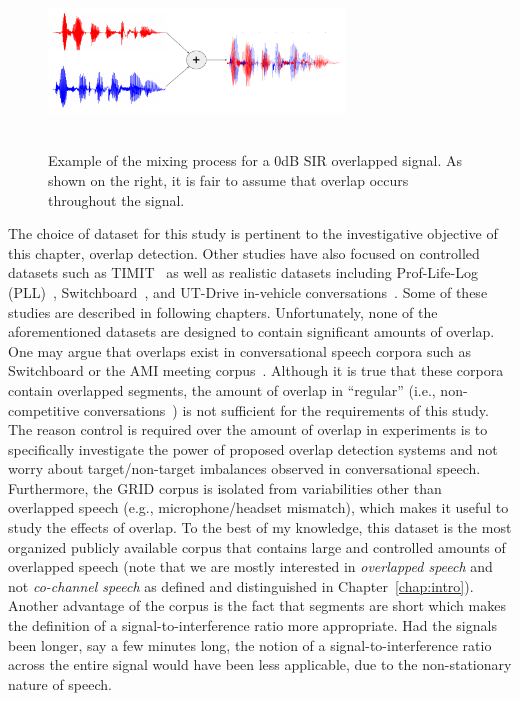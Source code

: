 \vspace{0mm}
\begin{figure}[h!]
	\centering
	\includegraphics[height =1.8in, width=0.7\textwidth]{figures/GRID_example_overlap-crop}
	\vspace{-2mm}
	\caption{ 
		Example of the mixing process for a 0dB SIR overlapped signal. As shown on the right, it is fair to assume that overlap occurs throughout the signal.}
	\label{fig:ch2_overlap_example}
\end{figure}

The choice of dataset for this study is pertinent to the investigative objective of this chapter, overlap detection. 
Other studies have also focused on controlled datasets such as TIMIT~\cite{nav_icassp13} as well as realistic datasets including Prof-Life-Log (PLL)~\cite{ziaei2013prof,nav_icassp15}, Switchboard~\cite{shokouhi2015}, and UT-Drive in-vehicle conversations~\cite{sathyanarayana2013belt}. 
Some of these studies are described in following chapters. 
Unfortunately, none of the aforementioned datasets are designed to contain significant amounts of overlap. 
One may argue that overlaps exist in conversational speech corpora such as Switchboard or the AMI meeting corpus~\cite{amicorpus}. 
Although it is true that these corpora contain overlapped segments, the amount of overlap in ``regular'' (i.e., non-competitive conversations~\cite{schegloff2000overlapping}) is not sufficient for the requirements of this study. 
The reason control is required over the amount of overlap in experiments is to specifically investigate the power of proposed overlap detection systems and not worry about target/non-target imbalances observed in conversational speech. 
Furthermore, the GRID corpus is isolated from variabilities other than overlapped speech (e.g., microphone/headset mismatch), which makes it useful to study the effects of overlap. 
To the best of my knowledge, this dataset is the most organized publicly available corpus that contains large and controlled amounts of overlapped speech (note that we are mostly interested in {\it overlapped speech} and not {\it co-channel speech} as defined and distinguished in Chapter~\ref{chap:intro}). 
Another advantage of the corpus is the fact that segments are short which makes the definition of a signal-to-interference ratio more appropriate. Had the signals been longer, say a few minutes long, the notion of a signal-to-interference ratio across the entire signal would have been less applicable, due to the non-stationary nature of speech. 

